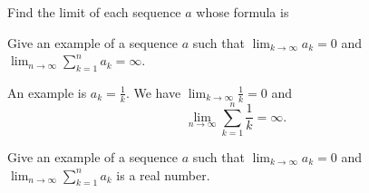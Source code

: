 \documentclass[12pt,fleqn,answers]{exam}
\begin{document}
\begin{questions}
    \question Find the limit of each sequence $a$ whose formula is
    
    \question   Give an example of a sequence $a$ such that
    $\displaystyle \lim_{k \to \infty} a_k = 0$ and $\displaystyle \lim_{n \to \infty} \sum_{k=1}^n a_k  = \infty$.
    
    \begin{solution}[1.50in]
    An example is $a_k = \frac{1}{k}$.  We have 
    $\displaystyle \lim_{k \to \infty} \frac{1}{k} = 0$ and 
        \begin{equation*}
              \lim_{n\to \infty}  \sum_{k=1}^n \frac{1}{k} = \infty.
        \end{equation*}
    \end{solution}
    \question   Give an example of a sequence $a$ such that
    $\displaystyle \lim_{k \to \infty} a_k = 0$ and $\displaystyle \lim_{n \to \infty} \sum_{k=1}^n a_k$ is a real 
    number.
    

\end{questions}
\end{document}

